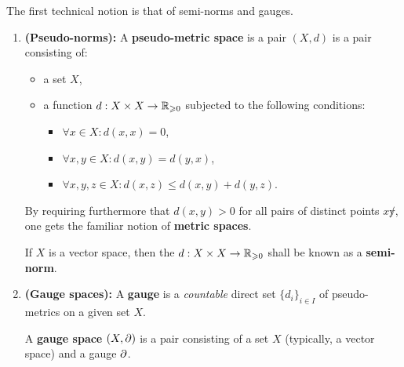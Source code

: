                 The first technical notion is that of semi-norms and gauges.
                \begin{definition} \label{def: seminorms_and_gauges}
                    \noindent
                    \begin{enumerate}
                        \item \textbf{(Pseudo-norms):} A \textbf{pseudo-metric space} is a pair $(X, d)$ is a pair consisting of:
                            \begin{itemize}
                                \item a set $X$,
                                \item a function $d: X \x X \to \R_{\geq 0}$ subjected to the following conditions:
                                    \begin{itemize}
                                        \item $\forall x \in X: d(x, x) = 0$,
                                        \item $\forall x, y \in X: d(x, y) = d(y, x)$,
                                        \item $\forall x, y, z \in X: d(x, z) \leq d(x, y) + d(y, z)$.
                                    \end{itemize}
                            \end{itemize}
                        By requiring furthermore that $d(x, y) > 0$ for all pairs of distinct points $x \not y$, one gets the familiar notion of \textbf{metric spaces}.
                        
                        If $X$ is a vector space, then the $d: X \x X \to \R_{\geq 0}$ shall be known as a \textbf{semi-norm}.
                        \item \textbf{(Gauge spaces):} A \textbf{gauge} is a \textit{countable} direct set $\{d_i\}_{i \in I}$ of pseudo-metrics on a given set $X$. 
                        
                        A \textbf{gauge space} $(X, \partial)$ is a pair consisting of a set $X$ (typically, a vector space) and a gauge $\partial$.
                    \end{enumerate}
                \end{definition}
